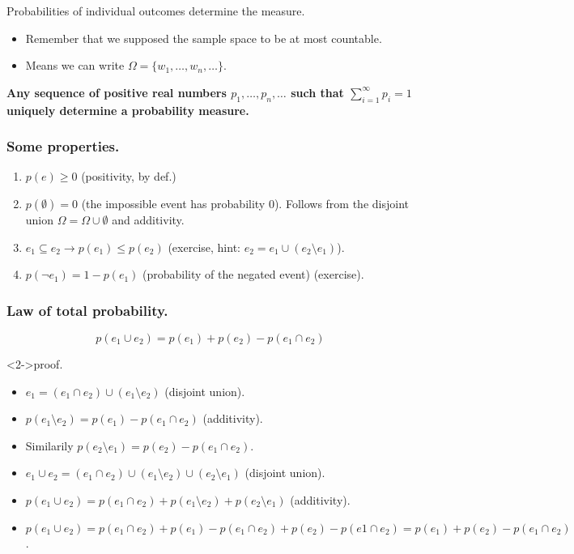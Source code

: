 \documentclass{beamer}
\begin{document}
\begin{frame}{Probabilities of individual outcomes determine the measure.}
  \begin{itemize}
  \item Remember that we supposed the sample space to be at most countable.
  \item Means we can write $\Omega = \{ w_1, \dots, w_n, \dots\}$.
  \end{itemize}

  {\bf Any sequence of positive real numbers $p_1, \dots, p_n, \dots$ such that $\sum^{\infty}_{i=1} p_i = 1$ uniquely determine a probability measure.}
\end{frame}

\begin{frame}
  \frametitle{Some properties.}
  \begin{enumerate}
  \item $p(e) \ge 0$ (positivity, by def.)
  \item $p(\emptyset) = 0$ (the impossible event has probability $0$). Follows from the disjoint union $\Omega = \Omega \cup \emptyset$ and additivity.
  \item $e_1 \subseteq e_2 \rightarrow p(e_1) \le p(e_2)$ (exercise, hint: $e_2 = e_1 \cup (e_2 \setminus e_1)$).
  \item $p(\neg e_1) = 1 - p(e_1)$ (probability of the negated event) (exercise).
  \end{enumerate}
\end{frame}

\begin{frame}
  \frametitle{Law of total probability.}
  \[ p(e_1 \cup e_2) = p(e_1) + p(e_2) - p(e_1 \cap e_2)\]

  \begin{block}<2->{proof.}
    \begin{itemize}
    \item<3-> $e_1 = (e_1 \cap e_2) \cup (e_1 \setminus e_2)$ (disjoint union).
    \item<4-> $p(e_1 \setminus e_2) = p(e_1) - p(e_1 \cap e_2)$ (additivity).
    \item<5-> Similarily $p(e_2 \setminus e_1) = p(e_2) - p(e_1 \cap e_2)$.
    \item<6-> $e_1 \cup e_2 = (e_1 \cap e_2) \cup (e_1 \setminus e_2) \cup (e_2 \setminus e_1)$ (disjoint union).
    \item<7-> $p(e_1 \cup e_2) = p(e_1 \cap e_2) + p(e_1 \setminus e_2) + p(e_2 \setminus e_1)$ (additivity).
    \item<8-> $p(e_1 \cup e_2) = p(e_1 \cap e_2) + p(e_1) - p(e_1 \cap e_2) + p(e_2) - p(e1 \cap e_2) = p(e_1) + p(e_2) - p(e_1 \cap e_2)$.
    \end{itemize}
  \end{block}
\end{frame}
  
\end{document}
